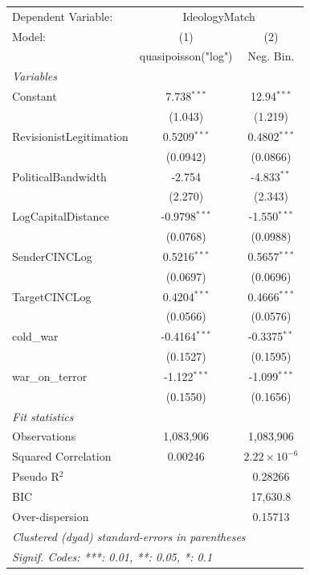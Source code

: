 
\begingroup
\centering
\begin{tabular}{lcc}
   \tabularnewline \midrule \midrule
   Dependent Variable: & \multicolumn{2}{c}{IdeologyMatch}\\
   Model:                  & (1)                  & (2)\\  
                           &  quasipoisson("log") & Neg. Bin.\\  
   \midrule
   \emph{Variables}\\
   Constant                & 7.738$^{***}$        & 12.94$^{***}$\\   
                           & (1.043)              & (1.219)\\   
   RevisionistLegitimation & 0.5209$^{***}$       & 0.4802$^{***}$\\   
                           & (0.0942)             & (0.0866)\\   
   PoliticalBandwidth      & -2.754               & -4.833$^{**}$\\   
                           & (2.270)              & (2.343)\\   
   LogCapitalDistance      & -0.9798$^{***}$      & -1.550$^{***}$\\   
                           & (0.0768)             & (0.0988)\\   
   SenderCINCLog           & 0.5216$^{***}$       & 0.5657$^{***}$\\   
                           & (0.0697)             & (0.0696)\\   
   TargetCINCLog           & 0.4204$^{***}$       & 0.4666$^{***}$\\   
                           & (0.0566)             & (0.0576)\\   
   cold\_war               & -0.4164$^{***}$      & -0.3375$^{**}$\\   
                           & (0.1527)             & (0.1595)\\   
   war\_on\_terror         & -1.122$^{***}$       & -1.099$^{***}$\\   
                           & (0.1550)             & (0.1656)\\   
   \midrule
   \emph{Fit statistics}\\
   Observations            & 1,083,906            & 1,083,906\\  
   Squared Correlation     & 0.00246              & $2.22\times 10^{-6}$\\   
   Pseudo R$^2$            &                      & 0.28266\\  
   BIC                     &                      & 17,630.8\\  
   Over-dispersion         &                      & 0.15713\\  
   \midrule \midrule
   \multicolumn{3}{l}{\emph{Clustered (dyad) standard-errors in parentheses}}\\
   \multicolumn{3}{l}{\emph{Signif. Codes: ***: 0.01, **: 0.05, *: 0.1}}\\
\end{tabular}
\par\endgroup


